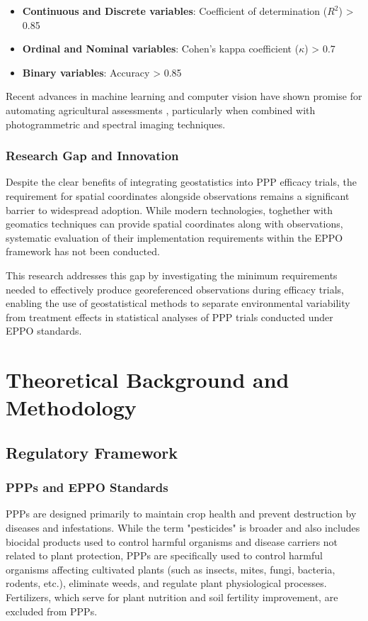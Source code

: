 \documentclass[12pt,a4paper,oneside]{report}
\begin{document}
\begin{itemize}
    \item \textbf{Continuous and Discrete variables}: Coefficient of determination ($R^2$) > 0.85
    \item \textbf{Ordinal and Nominal variables}: Cohen's kappa coefficient ($\kappa$) > 0.7  
    \item \textbf{Binary variables}: Accuracy > 0.85
\end{itemize}

Recent advances in machine learning and computer vision have shown promise for automating agricultural assessments \cite{mahleinPlantDiseaseDetection2016,kamilarisDeepLearningAgriculture2018}, particularly when combined with photogrammetric and spectral imaging techniques.

\subsection{Research Gap and Innovation}

Despite the clear benefits of integrating geostatistics into PPP efficacy trials, the requirement for spatial coordinates alongside observations remains a significant barrier to widespread adoption. While modern technologies, toghether with geomatics techniques can provide spatial coordinates along with observations, systematic evaluation of their implementation requirements within the EPPO framework has not been conducted.

This research addresses this gap by investigating the minimum requirements needed to effectively produce georeferenced observations during efficacy trials, enabling the use of geostatistical methods to separate environmental variability from treatment effects in statistical analyses of PPP trials conducted under EPPO standards.

\chapter{Theoretical Background and Methodology}

\section{Regulatory Framework}

\subsection{PPPs and EPPO Standards}
PPPs are designed primarily to maintain crop health 
and prevent destruction by diseases and infestations. While the term "pesticides" 
is broader and also includes biocidal products used to control harmful organisms 
and disease carriers not related to plant protection, PPPs are 
specifically used to control harmful organisms affecting cultivated plants (such 
as insects, mites, fungi, bacteria, rodents, etc.), eliminate weeds, and regulate 
plant physiological processes. Fertilizers, which serve for plant nutrition and 
soil fertility improvement, are excluded from PPPs.
\end{document}
